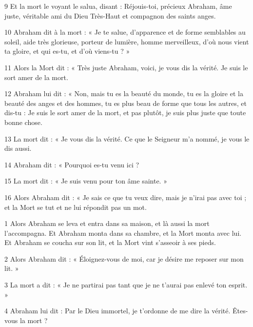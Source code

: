 \par 9 Et la mort le voyant le salua, disant : Réjouis-toi, précieux Abraham, âme juste, véritable ami du Dieu Très-Haut et compagnon des saints anges.

\par 10 Abraham dit à la mort : « Je te salue, d'apparence et de forme semblables au soleil, aide très glorieuse, porteur de lumière, homme merveilleux, d'où nous vient ta gloire, et qui es-tu, et d'où viens-tu ? »

\par 11 Alors la Mort dit : « Très juste Abraham, voici, je vous dis la vérité. Je suis le sort amer de la mort.

\par 12 Abraham lui dit : « Non, mais tu es la beauté du monde, tu es la gloire et la beauté des anges et des hommes, tu es plus beau de forme que tous les autres, et dis-tu : Je suis le sort amer de la mort, et pas plutôt, je suis plus juste que toute bonne chose.

\par 13 La mort dit : « Je vous dis la vérité. Ce que le Seigneur m’a nommé, je vous le dis aussi.

\par 14 Abraham dit : « Pourquoi es-tu venu ici ?

\par 15 La mort dit : « Je suis venu pour ton âme sainte. »

\par 16 Alors Abraham dit : « Je sais ce que tu veux dire, mais je n'irai pas avec toi ; et la Mort se tut et ne lui répondit pas un mot.


\par 1 Alors Abraham se leva et entra dans sa maison, et là aussi la mort l'accompagna. Et Abraham monta dans sa chambre, et la Mort monta avec lui. Et Abraham se coucha sur son lit, et la Mort vint s'asseoir à ses pieds.

\par 2 Alors Abraham dit : « Éloignez-vous de moi, car je désire me reposer sur mon lit. »

\par 3 La mort a dit : « Je ne partirai pas tant que je ne t'aurai pas enlevé ton esprit. »

\par 4 Abraham lui dit : Par le Dieu immortel, je t'ordonne de me dire la vérité. Êtes-vous la mort ?

